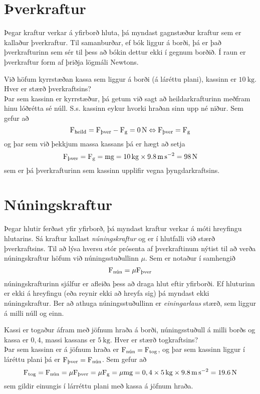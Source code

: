 \section{Þverkraftur}
Þegar kraftur verkar á yfirborð hluta, þá myndast gagnstæður kraftur sem er 
kallaður þverkraftur. Til samanburðar, ef bók liggur á borði, þá er það
þverkrafturinn sem sér til þess að bókin dettur ekki í gegnum borðið. Í raun
er þverkraftur form af þriðja lögmáli Newtons.
\begin{formalexample}
Við höfum kyrrstæðan kassa sem liggur á borði (á láréttu plani), kassinn 
er $\SI{10}{\kg}$.
Hver er stærð þverkraftsins?
\\[4 ex]
Þar sem kassinn er kyrrstæður, þá getum við sagt að heildarkrafturinn meðfram
hinu lóðrétta sé núll. S.s. kassinn eykur hvorki hraðan sinn upp né niður. Sem
gefur að
\[
	\textrm{F}_\text{heild} = \textrm{F}_\text{þver} - \textrm{F}_\text{g} 
		= \SI{0}{\newton}
	\Leftrightarrow \textrm{F}_\text{þver} = \textrm{F}_\text{g}
\]
og þar sem við þekkjum massa kassans þá er hægt að setja
\[
	\uforce_\text{þver} = \uforce_\text{g} 
		= \umass \uacceleg
		= \SI{10}{\kg} \times \SI{9.8}{\meter\per\second\squared}
		= \SI{98}{\newton}
\]
sem er þá þverkrafturinn sem kassinn upplifir vegna þyngdarkraftsins.
\end{formalexample}

\section{Núningskraftur}
Þegar hlutir ferðast yfir yfirborð, þá myndast kraftur verkar á
móti hreyfingu hlutarins. Sá kraftur kallast \emph{núningskraftur} og er í
hlutfalli við stærð þverkraftsins. Til að lýsa hversu stór prósenta af
þverkraftinum nýtist til að verða núningskraftur höfum við núningsstuðullinn 
$\mu$. Sem er notaður í samhengið
\begin{equation}
	\textrm{F}_\text{nún} = \mu \textrm{F}_\text{þver}
\end{equation}
núningskrafturinn sjálfur er afleiða þess að draga hlut eftir yfirborði. Ef
hluturinn er ekki á hreyfingu (eða reynir ekki að hreyfa sig) þá myndast ekki
núningskraftur. Ber að athuga núningsstuðullinn er \emph{einingarlaus} stærð, 
sem liggur á milli núll og einn.
\begin{formalexample}
Kassi er togaður áfram með jöfnum hraða á borði, núningsstuðull á milli borðs
og kassa er $0,4$, massi kassans er $\SI{5}{\kg}$.
Hver er stærð togkraftsins?
\\[4 ex]
Þar sem kassinn er á jöfnum hraða er $\textrm{F}_\text{nún} = \textrm{F}_\text{tog}$,
og þar sem kassinn liggur í láréttu plani þá er $\textrm{F}_\text{þver} 
= \textrm{F}_\text{nún}$. Sem gefur að
\[
	\uforce_\text{tog} = \uforce_\text{nún} 
		= \mu \uforce_\text{þver}
		= \mu \uforce_\text{g}
		= \mu \umass \uacceleg
		= 0,4 \times \SI{5}{\kg} \times \SI{9.8}{\meter\per\second\squared}
		= \SI{19.6}{\newton}
\]
sem gildir einungis í lárréttu plani með kassa á jöfnum hraða.
\end{formalexample}


